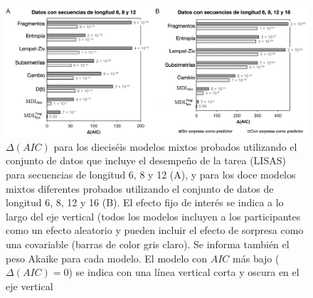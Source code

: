 \begin{figure}[t!]
   \includegraphics[scale=0.8]{figuras/plosbio/journal.pcbi.1008598.g008_SP.PNG}
   
   \centering
   
   \caption{$\Delta(AIC)$ para los dieciséis modelos mixtos probados utilizando el conjunto de datos que incluye el desempeño de la tarea (LISAS) para secuencias de longitud 6, 8 y 12 (A), y para los doce modelos mixtos diferentes probados utilizando el conjunto de datos de longitud 6, 8, 12 y 16 (B). El efecto fijo de interés se indica a lo largo del eje vertical (todos los modelos incluyen a los participantes como un efecto aleatorio y pueden incluir el efecto de sorpresa como una covariable (barras de color gris claro). Se informa también el peso Akaike para cada modelo. El modelo con $AIC$ más bajo ($\Delta (AIC) = 0$) se indica con una línea vertical corta y oscura en el eje vertical}
   \label{PlosBIO-F8}
\end{figure}


